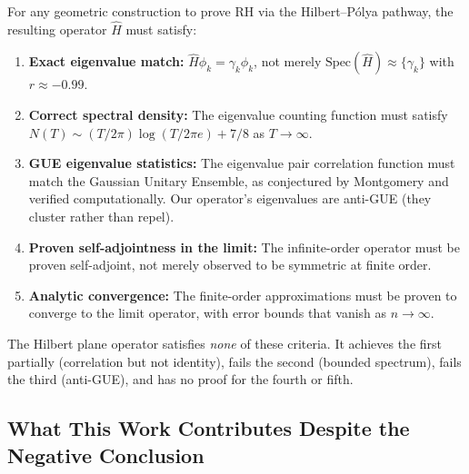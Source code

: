 \documentclass[11pt,a4paper]{article}
\begin{document}
For any geometric construction to prove RH via the Hilbert--P\'{o}lya
pathway, the resulting operator $\hat{H}$ must satisfy:

\begin{enumerate}
\item \textbf{Exact eigenvalue match:} $\hat{H}\phi_k = \gamma_k \phi_k$,
   not merely $\text{Spec}(\hat{H}) \approx \{\gamma_k\}$ with $r \approx
   -0.99$.

\item \textbf{Correct spectral density:} The eigenvalue counting function
   must satisfy $N(T) \sim (T/2\pi)\log(T/2\pi e) + 7/8$ as $T \to
   \infty$.

\item \textbf{GUE eigenvalue statistics:} The eigenvalue pair correlation
   function must match the Gaussian Unitary Ensemble, as conjectured by
   Montgomery and verified computationally. Our operator's eigenvalues
   are anti-GUE (they cluster rather than repel).

\item \textbf{Proven self-adjointness in the limit:} The infinite-order
   operator must be proven self-adjoint, not merely observed to be
   symmetric at finite order.

\item \textbf{Analytic convergence:} The finite-order approximations must
   be proven to converge to the limit operator, with error bounds that
   vanish as $n \to \infty$.
\end{enumerate}

The Hilbert plane operator satisfies \emph{none} of these criteria. It
achieves the first partially (correlation but not identity), fails the
second (bounded spectrum), fails the third (anti-GUE), and has no proof
for the fourth or fifth.

\subsection{What This Work Contributes Despite the Negative Conclusion}
\end{document}
